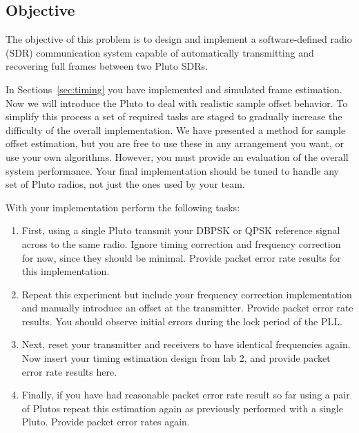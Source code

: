 \documentclass[letterpaper,12pt]{article}
\begin{document}
%


\subsection{Objective}
The objective of this problem is to design and implement a
software-defined radio (SDR) communication system capable of
automatically transmitting and recovering full frames between two Pluto
SDRs.

In Sections~\ref{sec:timing} you have implemented and simulated frame estimation.  
Now we will introduce the Pluto to deal with realistic sample offset behavior.  To simplify this process a set of required tasks are staged to gradually increase the difficulty of the overall implementation.  We have presented a method for sample offset estimation, but you are free to use these in any arrangement you want, or use your own algorithms.  However, you must 
provide an evaluation of the overall system performance.  Your final implementation should be tuned to handle 
any set of Pluto radios, not just the ones used by your team.\par
%
With your implementation perform the following tasks:
%
\begin{enumerate}
 \item First, using a single Pluto transmit your DBPSK or QPSK reference signal across to the same radio.  Ignore timing correction and frequency correction for now, since they should be minimal.  Provide packet error rate results for this implementation.
\item Repeat this experiment but include your frequency correction implementation and manually introduce an offset at the transmitter.  Provide packet error rate results.  You should observe initial errors during the lock period of the PLL.
\item Next, reset your transmitter and receivers to have identical frequencies again.  Now insert your timing estimation design from lab 2, and provide packet error rate results here.
\item Finally, if you have had reasonable packet error rate result so far  using a pair of Plutos repeat this estimation again as previously performed with a single Pluto.  Provide packet error rates again.
\end{enumerate}
%
\end{document}

